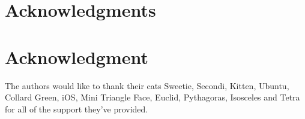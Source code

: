 \documentclass[10pt,journal,compsoc]{IEEEtran}
\begin{document}
\ifCLASSOPTIONcompsoc
  \section*{Acknowledgments}
\else
  \section*{Acknowledgment}
\fi


The authors would like to thank their cats Sweetie, Secondi, Kitten, Ubuntu, Collard Green, iOS, Mini Triangle Face, Euclid, Pythagoras, Isosceles and Tetra for all of the support they've provided.


\ifCLASSOPTIONcaptionsoff
  \newpage
\fi





%
%
%



\end{document}
